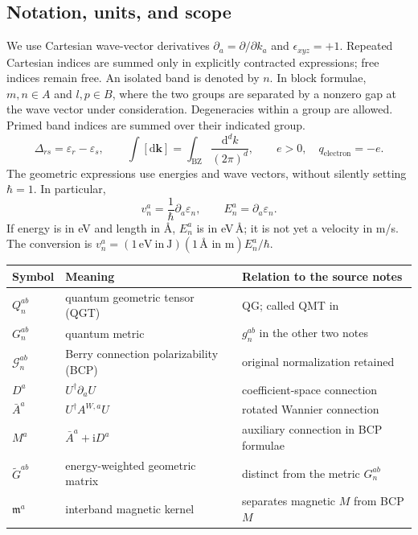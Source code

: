 \documentclass[prx,amsmath,amssymb,superscriptaddress,longbibliography]{revtex4-2}
\newcommand{\dd}{\mathrm{d}}
\newcommand{\ii}{\mathrm{i}}
\newcommand{\code}[1]{\texttt{\detokenize{#1}}}
\begin{document}
\subsection{Notation, units, and scope}
\label{sec:notation}
We use Cartesian wave-vector derivatives
$\partial_a=\partial/\partial k_a$ and $\epsilon_{xyz}=+1$.
Repeated Cartesian indices are summed only in explicitly contracted expressions;
free indices remain free. An isolated band is denoted by $n$.
In block formulae, $m,n\in A$ and $l,p\in B$, where the two groups
are separated by a nonzero gap at the wave vector under consideration.
Degeneracies within a group are allowed. Primed band indices are summed over
their indicated group.
\begin{equation}
 \Delta_{rs}=\varepsilon_r-\varepsilon_s,\qquad
 \int[\dd\bm{k}]=\int_{\mathrm{BZ}}\frac{\dd^d k}{(2\pi)^d},\qquad
 e>0,\quad q_{\mathrm{electron}}=-e.
 \label{eq:conventions}
\end{equation}
The geometric expressions use energies and wave vectors, without silently
setting $\hbar=1$. In particular,
\begin{equation}
 v_n^a=\frac{1}{\hbar}\partial_a\varepsilon_n,\qquad
 E_n^{a}=\partial_a\varepsilon_n.
 \label{eq:velocity-units}
\end{equation}
If energy is in eV and length in \AA, $E_n^a$ is in eV\,\AA;
it is not yet a velocity in m/s. The conversion is
$v_n^a=(1\,\mathrm{eV\ in\ J})(1\,\text{\AA\ in m})E_n^a/\hbar$.

\begin{center}
\setlength{\tabcolsep}{6pt}
\begin{tabular}{lll}
\toprule
Symbol & Meaning & Relation to the source notes\\
\midrule
$Q_n^{ab}$ & quantum geometric tensor (QGT) & QG; called QMT in \code{formulae.tex}\\
$G_n^{ab}$ & quantum metric & $g_n^{ab}$ in the other two notes\\
$\mathcal G_n^{ab}$ & Berry connection polarizability (BCP) & original normalization retained\\
$D^a$ & $U^\dagger\partial_a U$ & coefficient-space connection\\
$\bar A^a$ & $U^\dagger A^{W,a}U$ & rotated Wannier connection\\
$M^a$ & $\bar A^a+\ii D^a$ & auxiliary connection in BCP formulae\\
$\widetilde G^{ab}$ & energy-weighted geometric matrix & distinct from the metric $G_n^{ab}$\\
$\mathfrak m^a$ & interband magnetic kernel & separates magnetic $M$ from BCP $M$\\
\bottomrule
\end{tabular}
\end{center}
\end{document}
